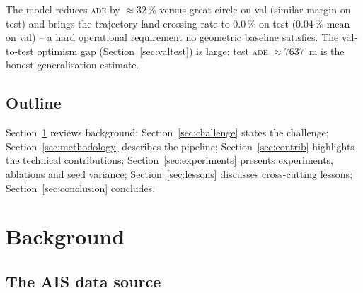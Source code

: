 \documentclass[oneside, a4paper, onecolumn, 11pt]{article}
\newcommand{\ade}{\textsc{ade}}
\newcommand{\fde}{\textsc{fde}}
\begin{document}
\begin{table}[h]
\centering
\caption{Headline performance on the cleaned \emph{validation} set
(5-seed mean $\pm$ std on disjoint 500-route subsamples).
Lower is better for \ade{} and cross\%; \fde{} is uninformative for
endpoint-correct methods.}
\label{tab:headline}

\end{table}

\begin{table}[h]
\centering
\caption{Headline performance on the fully held-out cleaned \emph{test}
set ($n = 2326$, single shot, no \textsc{mmsi} overlap with train or
val). Test ADE is consistently $\approx 30\,\%$ above val ADE
across all methods (Section~\ref{sec:valtest}).}
\label{tab:headline_test}

\end{table}

The model reduces \ade{} by $\approx 32\,\%$ versus great-circle on
val (similar margin on test) and brings the trajectory land-crossing
rate to $0.0\,\%$ on test ($0.04\,\%$ mean on val) -- a hard
operational requirement no geometric baseline satisfies.  The
val-to-test optimism gap (Section~\ref{sec:valtest}) is large: test
\ade{} $\approx 7637$~m is the honest generalisation estimate.

\subsection{Outline}

Section~\ref{sec:background} reviews background;
Section~\ref{sec:challenge} states the challenge;
Section~\ref{sec:methodology} describes the pipeline;
Section~\ref{sec:contrib} highlights the technical contributions;
Section~\ref{sec:experiments} presents experiments, ablations and
seed variance; Section~\ref{sec:lessons} discusses cross-cutting
lessons; Section~\ref{sec:conclusion} concludes.

\section{Background}\label{sec:background}

\subsection{The AIS data source}
\end{document}
